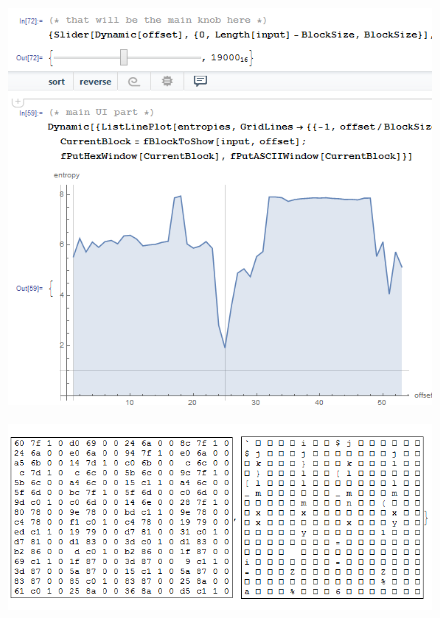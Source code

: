 \begin{figure}[H]
\centering
\includegraphics[width=\EntropyGfxScale]{ff/entropy/notepad11.png}
\end{figure}

\begin{figure}[H]
\centering
\includegraphics[width=\EntropyGfxScale]{ff/entropy/notepad12.png}
\end{figure}
